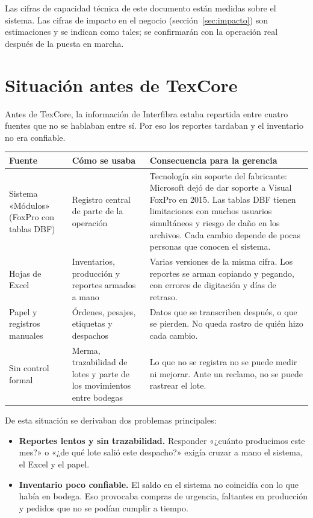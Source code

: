 \documentclass[11pt,a4paper]{article}
\newcommand{\encabezado}{\rowcolor{fondo}}
\begin{document}
Las cifras de capacidad técnica de este documento están medidas sobre el sistema. Las cifras de impacto en el negocio (sección~\ref{sec:impacto}) son estimaciones y se indican como tales; se confirmarán con la operación real después de la puesta en marcha.

\section{Situación antes de TexCore}

Antes de TexCore, la información de Interfibra estaba repartida entre cuatro fuentes que no se hablaban entre sí. Por eso los reportes tardaban y el inventario no era confiable.

\begin{center}
\begin{tabularx}{\textwidth}{P{3.3cm}P{4.2cm}L}
\toprule
\encabezado \textbf{Fuente} & \textbf{Cómo se usaba} & \textbf{Consecuencia para la gerencia} \\
\midrule
Sistema «Módulos» (FoxPro con tablas DBF) & Registro central de parte de la operación & Tecnología sin soporte del fabricante: Microsoft dejó de dar soporte a Visual FoxPro en 2015. Las tablas DBF tienen limitaciones con muchos usuarios simultáneos y riesgo de daño en los archivos. Cada cambio depende de pocas personas que conocen el sistema. \\
Hojas de Excel & Inventarios, producción y reportes armados a mano & Varias versiones de la misma cifra. Los reportes se arman copiando y pegando, con errores de digitación y días de retraso. \\
Papel y registros manuales & Órdenes, pesajes, etiquetas y despachos & Datos que se transcriben después, o que se pierden. No queda rastro de quién hizo cada cambio. \\
Sin control formal & Merma, trazabilidad de lotes y parte de los movimientos entre bodegas & Lo que no se registra no se puede medir ni mejorar. Ante un reclamo, no se puede rastrear el lote. \\
\bottomrule
\end{tabularx}
\end{center}

De esta situación se derivaban dos problemas principales:

\begin{itemize}
  \item \textbf{Reportes lentos y sin trazabilidad.} Responder «¿cuánto producimos este mes?» o «¿de qué lote salió este despacho?» exigía cruzar a mano el sistema, el Excel y el papel.
  \item \textbf{Inventario poco confiable.} El saldo en el sistema no coincidía con lo que había en bodega. Eso provocaba compras de urgencia, faltantes en producción y pedidos que no se podían cumplir a tiempo.
\end{itemize}
\end{document}
